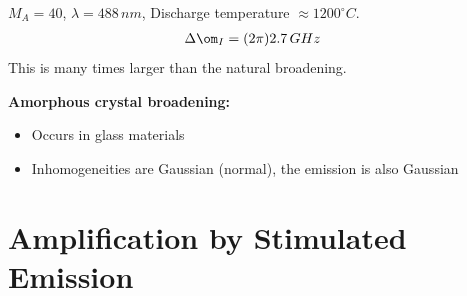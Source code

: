 \documentclass[a4paper, 11pt, normalem]{report}
\begin{document}
\begin{example}
$M_A = 40$, $\lambda=488\,nm$, Discharge temperature $\approx 1200^\circ C$.
\begin{align}
    \Delta\om_I &= (2\pi) 2.7\,GHz
\end{align}
This is many times larger than the natural broadening.
\end{example}
\textbf{Amorphous crystal broadening:}
\begin{itemize}
    \item Occurs in glass materials
    \item Inhomogeneities are Gaussian (normal), the emission is also Gaussian
\end{itemize}

\chapter{Amplification by Stimulated Emission}
\end{document}
